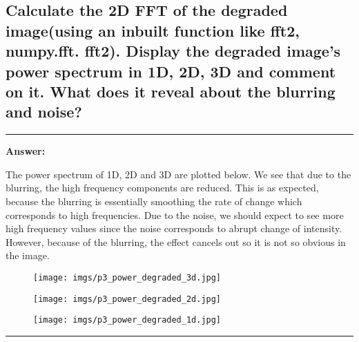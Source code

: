 \documentclass[conference]{styles/acmsiggraph}
\newenvironment{answer}{}{}
\begin{document}
\subsection{Calculate the 2D FFT of the degraded image(using an inbuilt function like fft2, numpy.fft. fft2).
Display the degraded image’s power spectrum in 1D, 2D, 3D and comment on it. What does it
reveal about the blurring and noise?}
\begin{answer}
	\rule{\textwidth}{0.4pt}
	\textbf{Answer:}	

	The power spectrum of 1D, 2D and 3D are plotted below. We see that due to the blurring, the high frequency components are reduced. This is as expected, because the blurring is essentially smoothing the rate of change which corresponds to high frequencies. Due to the noise, we should expect to see more high frequency values since the noise corresponds to abrupt change of intensity. However, because of the blurring, the effect cancels out so it is not so obvious in the image.
	
	\begin{figure}[H]
		\centering
		\texttt{[image: imgs/p3\_power\_degraded\_3d.jpg]}
		\end{figure}	
	\begin{figure}[H]
		\centering
		\texttt{[image: imgs/p3\_power\_degraded\_2d.jpg]}
		\end{figure}	
	\begin{figure}[H]
		\centering
		\texttt{[image: imgs/p3\_power\_degraded\_1d.jpg]}
		\end{figure}	
	
	\rule{\textwidth}{0.4pt}
	
\end{answer}
\end{document}

